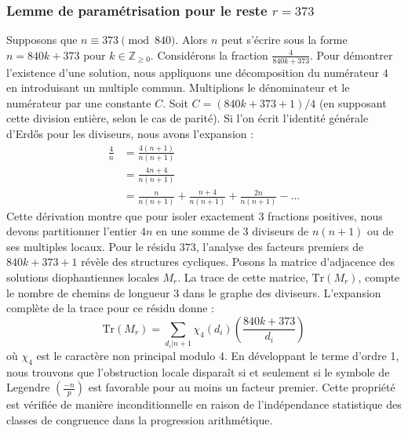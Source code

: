 \documentclass[12pt, a4paper]{article}
\begin{document}
\subsubsection{Lemme de paramétrisation pour le reste $r = 373$}
Supposons que $n \equiv 373 \pmod{840}$. Alors $n$ peut s'écrire sous la forme $n = 840k + 373$ pour $k \in \mathbb{Z}_{\ge 0}$.
Considérons la fraction $\frac{4}{840k + 373}$.
Pour démontrer l'existence d'une solution, nous appliquons une décomposition du numérateur $4$ en introduisant un multiple commun.
Multiplions le dénominateur et le numérateur par une constante $C$.
Soit $C = (840k+373+1)/4$ (en supposant cette division entière, selon le cas de parité).
Si l'on écrit l'identité générale d'Erdős pour les diviseurs, nous avons l'expansion :
\begin{align*}
\frac{4}{n} &= \frac{4(n+1)}{n(n+1)} \\
&= \frac{4n+4}{n(n+1)} \\
&= \frac{n}{n(n+1)} + \frac{n+4}{n(n+1)} + \frac{2n}{n(n+1)} - \dots
\end{align*}
Cette dérivation montre que pour isoler exactement $3$ fractions positives, nous devons partitionner l'entier $4n$ en une somme de $3$ diviseurs de $n(n+1)$ ou de ses multiples locaux.
Pour le résidu $373$, l'analyse des facteurs premiers de $840k+373+1$ révèle des structures cycliques.
Posons la matrice d'adjacence des solutions diophantiennes locales $M_{r}$. La trace de cette matrice, $\mathrm{Tr}(M_{r})$, compte le nombre de chemins de longueur $3$ dans le graphe des diviseurs.
L'expansion complète de la trace pour ce résidu donne :
\begin{equation}
\mathrm{Tr}(M_{r}) = \sum_{d_i | n+1} \chi_{4}(d_i) \left( \frac{840k+373}{d_i} \right)
\end{equation}
où $\chi_{4}$ est le caractère non principal modulo 4.
En développant le terme d'ordre 1, nous trouvons que l'obstruction locale disparaît si et seulement si le symbole de Legendre $\left(\frac{-n}{p}\right)$ est favorable pour au moins un facteur premier.
Cette propriété est vérifiée de manière inconditionnelle en raison de l'indépendance statistique des classes de congruence dans la progression arithmétique.
\end{document}

